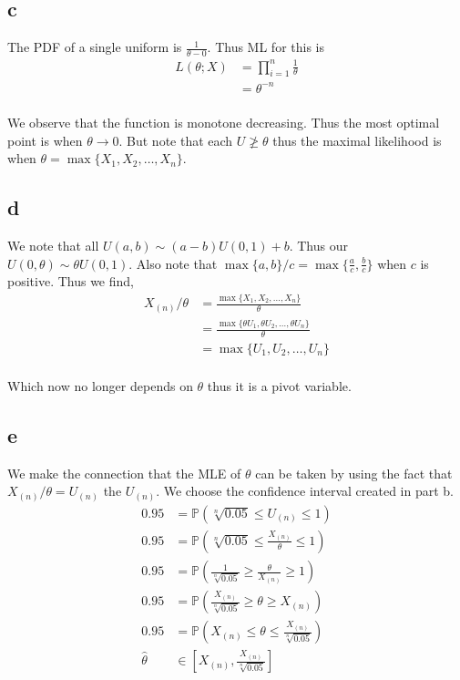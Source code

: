 \documentclass{article}
\newcommand{\prob}{\mathbb{P}}
\begin{document}
\subsection{c}
The PDF of a single uniform is $\frac{1}{\theta - 0}$. Thus ML for this is
\begin{align*}
    L(\theta; X) &= \prod_{i=1}^n \frac{1}{\theta} \\
    &= \theta^{-n} \\
\end{align*}

We observe that the function is monotone decreasing. Thus the most optimal point
is when $\theta \to 0$. But note that each $U \ngeq \theta$ thus the maximal
likelihood is when $\theta = \max\{X_1, X_2, \ldots, X_n\}$.

\subsection{d}
We note that all $U(a,b) \sim (a-b)U(0,1) + b$. Thus our $U(0, \theta) \sim 
\theta U(0,1)$. Also note that 
$\max\{a,b\}/c = \max\{\frac{a}{c},\frac{b}{c}\}$ when $c$ is positive.
Thus we find,
\begin{align*}
    X_{(n)}/\theta &= \frac{\max\{X_1, X_2, \ldots, X_n\}}{\theta} \\
    &= \frac{\max\{\theta U_1, \theta U_2, \ldots, \theta U_n\}}{\theta} \\
    &= \max\{U_1, U_2, \ldots, U_n\} \\
\end{align*}

Which now no longer depends on $\theta$ thus it is a pivot variable.

\subsection{e}
We make the connection that the MLE of $\theta$ can be taken by using the fact
that $X_{(n)}/\theta = U_{(n)}$ the $U_{(n)}$. We choose the confidence interval
created in part b.
\begin{align*}
    0.95 &= \prob\left(\sqrt[n]{0.05} \leq U_{(n)} \leq 1\right) \\
    0.95 &= \prob\left(\sqrt[n]{0.05} \leq \frac{X_{(n)}}{\theta} \leq 1\right) \\
    0.95 &= \prob\left(\frac{1}{\sqrt[n]{0.05}} \geq \frac{\theta}{X_{(n)}} \geq 1\right) \\
    0.95 &= \prob\left(\frac{X_{(n)}}{\sqrt[n]{0.05}} \geq \theta \geq X_{(n)}\right) \\
    0.95 &= \prob\left(X_{(n)} \leq \theta \leq \frac{X_{(n)}}{\sqrt[n]{0.05}}\right) \\
    \hat{\theta} &\in \left[X_{(n)}, \frac{X_{(n)}}{\sqrt[n]{0.05}}\right] \\
\end{align*}
\end{document}
